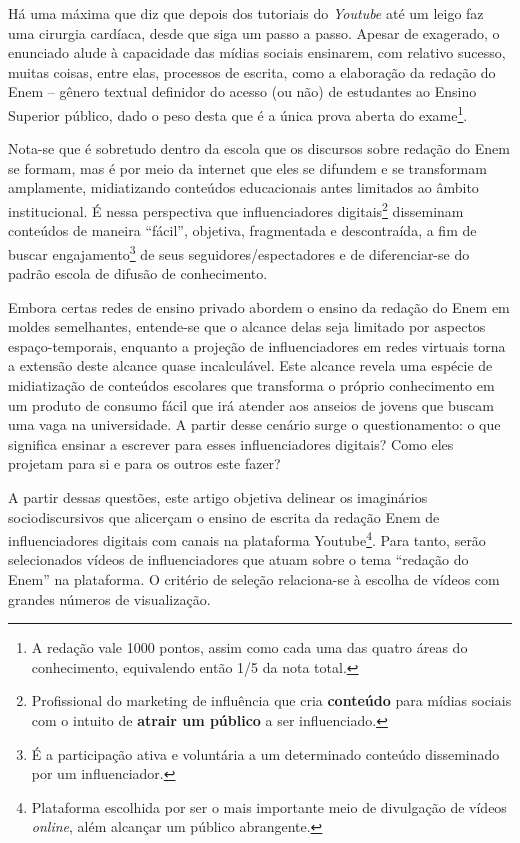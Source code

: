 \documentclass[portuguese]{textolivre}
\begin{document}
Há uma máxima que diz que depois dos tutoriais do \textit{Youtube} até um leigo faz uma cirurgia cardíaca, desde que siga um passo a passo. Apesar de exagerado, o enunciado alude à capacidade das mídias sociais ensinarem, com relativo sucesso, muitas coisas, entre elas, processos de escrita, como a elaboração da redação do Enem – gênero textual definidor do acesso (ou não) de estudantes ao Ensino Superior público, dado o peso desta que é a única prova aberta do exame\footnote{A redação vale 1000 pontos, assim como cada uma das quatro áreas do conhecimento, equivalendo então 1/5 da nota total.}.

Nota-se que é sobretudo dentro da escola que os discursos sobre redação do Enem se formam, mas é por meio da internet que eles se difundem e se transformam amplamente, midiatizando conteúdos educacionais antes limitados ao âmbito institucional. É nessa perspectiva que influenciadores digitais\footnote{Profissional do marketing de influência que cria \textbf{conteúdo} para mídias sociais com o intuito de \textbf{atrair um público} a ser influenciado.} disseminam conteúdos de maneira “fácil”, objetiva, fragmentada e descontraída, a fim de buscar engajamento\footnote{É a participação ativa e voluntária a um determinado conteúdo disseminado por um influenciador.} de seus seguidores/espectadores e de diferenciar-se do padrão escola de difusão de conhecimento.

Embora certas redes de ensino privado abordem o ensino da redação do Enem em moldes semelhantes, entende-se que o alcance delas seja limitado por aspectos espaço-temporais, enquanto a projeção de influenciadores em redes virtuais torna a extensão deste alcance quase incalculável. Este alcance revela uma espécie de midiatização de conteúdos escolares que transforma o próprio conhecimento em um produto de consumo fácil que irá atender aos anseios de jovens que buscam uma vaga na universidade. A partir desse cenário surge o questionamento: o que significa ensinar a escrever para esses influenciadores digitais? Como eles projetam para si e para os outros este fazer? 

A partir dessas questões, este artigo objetiva delinear os imaginários sociodiscursivos que alicerçam o ensino de escrita da redação Enem de influenciadores digitais com canais na plataforma Youtube\footnote{Plataforma escolhida por ser o mais importante meio de divulgação de vídeos \textit{online}, além alcançar um público abrangente.}. Para tanto, serão selecionados vídeos de influenciadores que atuam sobre o tema “redação do Enem” na plataforma. O critério de seleção relaciona-se à escolha de vídeos com grandes números de visualização.
\end{document}
